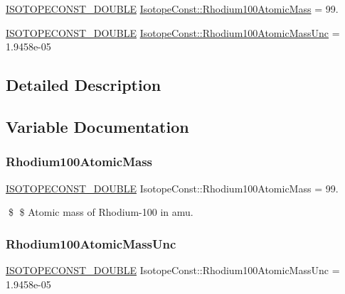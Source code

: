 \begin{DoxyCompactItemize}
\item 
\mbox{\hyperlink{group___isotope_const-_macros_ga8f45a7272ce02c0b4c65c44636ed719a}{I\+S\+O\+T\+O\+P\+E\+C\+O\+N\+S\+T\+\_\+\+D\+O\+U\+B\+LE}} \mbox{\hyperlink{group___isotope_const-_rhodium-_rh100_gafe0272fe0dddbdb465edae6ddfd618b8}{Isotope\+Const\+::\+Rhodium100\+Atomic\+Mass}} = 99.
\item 
\mbox{\hyperlink{group___isotope_const-_macros_ga8f45a7272ce02c0b4c65c44636ed719a}{I\+S\+O\+T\+O\+P\+E\+C\+O\+N\+S\+T\+\_\+\+D\+O\+U\+B\+LE}} \mbox{\hyperlink{group___isotope_const-_rhodium-_rh100_ga7794fe37649922467ac7c65a2a55cceb}{Isotope\+Const\+::\+Rhodium100\+Atomic\+Mass\+Unc}} = 1.\+9458e-\/05
\end{DoxyCompactItemize}


\subsection{Detailed Description}


\subsection{Variable Documentation}
\mbox{\label{group___isotope_const-_rhodium-_rh100_gafe0272fe0dddbdb465edae6ddfd618b8}} 
\subsubsection{\texorpdfstring{Rhodium100\+Atomic\+Mass}{Rhodium100AtomicMass}}
{\footnotesize\ttfamily \mbox{\hyperlink{group___isotope_const-_macros_ga8f45a7272ce02c0b4c65c44636ed719a}{I\+S\+O\+T\+O\+P\+E\+C\+O\+N\+S\+T\+\_\+\+D\+O\+U\+B\+LE}} Isotope\+Const\+::\+Rhodium100\+Atomic\+Mass = 99.}

\$ \$ Atomic mass of Rhodium-\/100 in amu. \mbox{\label{group___isotope_const-_rhodium-_rh100_ga7794fe37649922467ac7c65a2a55cceb}} 
\subsubsection{\texorpdfstring{Rhodium100\+Atomic\+Mass\+Unc}{Rhodium100AtomicMassUnc}}
{\footnotesize\ttfamily \mbox{\hyperlink{group___isotope_const-_macros_ga8f45a7272ce02c0b4c65c44636ed719a}{I\+S\+O\+T\+O\+P\+E\+C\+O\+N\+S\+T\+\_\+\+D\+O\+U\+B\+LE}} Isotope\+Const\+::\+Rhodium100\+Atomic\+Mass\+Unc = 1.\+9458e-\/05}

